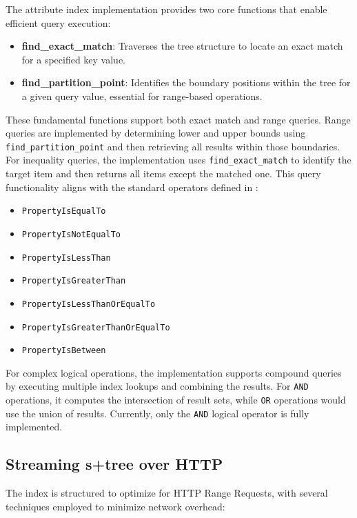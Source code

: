 The attribute index implementation provides two core functions that enable efficient query execution:

\begin{itemize}
\item \textbf{find\_exact\_match}: Traverses the tree structure to locate an exact match for a specified key value.
\item \textbf{find\_partition\_point}: Identifies the boundary positions within the tree for a given query value, essential for range-based operations.
\end{itemize}

These fundamental functions support both exact match and range queries. Range queries are implemented by determining lower and upper bounds using \texttt{find\_partition\_point} and then retrieving all results within those boundaries. For inequality queries, the implementation uses \texttt{find\_exact\_match} to identify the target item and then returns all items except the matched one. This query functionality aligns with the standard operators defined in \citet{ogc_filter_encoding_2010}:

\begin{itemize}
\item \texttt{PropertyIsEqualTo}
\item \texttt{PropertyIsNotEqualTo}
\item \texttt{PropertyIsLessThan}
\item \texttt{PropertyIsGreaterThan}
\item \texttt{PropertyIsLessThanOrEqualTo}
\item \texttt{PropertyIsGreaterThanOrEqualTo}
\item \texttt{PropertyIsBetween}
\end{itemize}

For complex logical operations, the implementation supports compound queries by executing multiple index lookups and combining the results. For \texttt{AND} operations, it computes the intersection of result sets, while \texttt{OR} operations would use the union of results. Currently, only the \texttt{AND} logical operator is fully implemented.

\subsection{Streaming \texorpdfstring{\ac{s+tree}}{S+tree} over HTTP}
\label{methodology:attribute_index:streaming_s_tree}

The index is structured to optimize for HTTP Range Requests, with several techniques employed to minimize network overhead:

